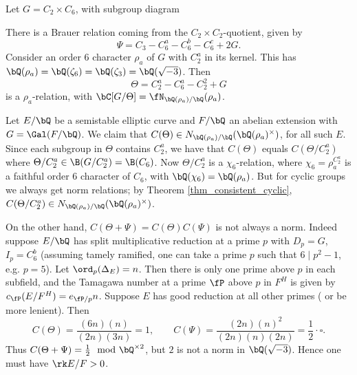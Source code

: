\begin{example}
    Let $G = C_2 \times C_6$, with subgroup diagram
    \begin{figure}[H]
        \centering
    \end{figure}
    There is a Brauer relation coming from the $C_2 \times C_2$-quotient, given by $$\Psi = C_3 - C_6^a - C_6^b - C_6^c + 2G.$$ Consider an order $6$ character $\rho_a$ of $G$ with $C_2^{a}$ in its kernel. This has $\bQ(\rho_a) = \bQ(\zeta_6) = \bQ(\zeta_3) = \bQ(\sqrt{-3})$. Then $$\Theta = C_2^{a} - C_6^{a} - C_2^{2} + G$$ is a $\rho_a$-relation, with $\bC[ G / \Theta] = \repnorm{\rho_a}$. 

    Let $E / \bQ$ be a semistable elliptic curve and $F / \bQ$ an abelian extension with $G = \Gal(F / \bQ)$. We claim that $C(\Theta) \in \fieldnorm{\rho_a}$, for all such $E$. Since each subgroup in $\Theta$ contains $C_2^{a}$, we have that $C(\Theta)$ equals $C(\Theta / C_2^{a})$ where $\Theta / C_2^{a} \in \B(G / C_2^{a}) = \B(C_6)$.  Now $\Theta / C_2^{a}$ is a $\chi_6$-relation, where $\chi_6 = \rho_a^{C_2^a}$ is a faithful order $6$ character of $C_6$, with $\bQ(\chi_6) = \bQ(\rho_a)$. But for cyclic groups we always get norm relations; by Theorem \ref{thm_consistent_cyclic}, $C(\Theta / C_2^{a}) \in \fieldnorm{\rho_a}$.

    On the other hand, $C(\Theta + \Psi) = C(\Theta)C(\Psi)$ is not always a norm. Indeed suppose $E / \bQ$ has split multiplicative reduction at a prime $p$ with $D_p = G$, $I_p = C_6^b$ (assuming tamely ramified, one can take a prime $p$ such that $6 \mid p^2 - 1$, e.g. $p = 5$). Let $\ord_p(\Delta_E) = n$. Then there is only one prime above $p$ in each subfield, and the Tamagawa number at a prime $\fP$ above $p$ in $F^H$ is given by $c_{\fP}(E / F^H) = e_{\fP / p} n$. Suppose $E$ has good reduction at all other primes ({\color{red} or be more lenient}).
     Then 
        $$C(\Theta) = \frac{(6n)(n)}{(2n) (3n)} = 1, \qquad
            C(\Psi) = \frac{(2n)(n)^2}{(2n)(n)(2n)} = \frac{1}{2} \cdot \square.$$
    Thus $C(\Theta + \Psi) = \frac{1}{2} \mod \bQ^{\times 2}$, but $2$ is not a norm in $\bQ(\sqrt{-3})$. Hence one must have $\rk E / F > 0$. 
\end{example}

